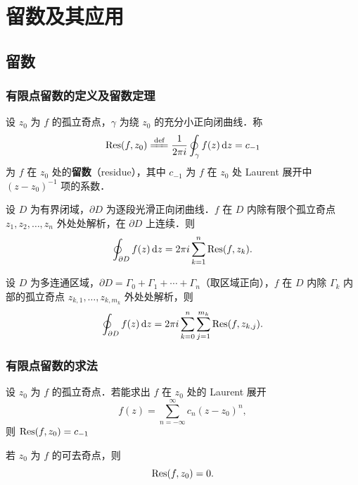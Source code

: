 \documentclass[12pt, a4paper, oneside, UTF8]{ctexbook}
\begin{document}
%
\else
\fi
\chapter{留数及其应用}

\section{留数}

\subsection{有限点留数的定义及留数定理}

\begin{definition}[有限点留数]
设 $z_0$ 为 $f$ 的孤立奇点，$\gamma$ 为绕 $z_0$ 的充分小正向闭曲线．称
\[
\Res(f,z_0) \defeq \frac{1}{2\pi i}\oint_\gamma f(z)\,\d z = c_{-1}
\]
为 $f$ 在 $z_0$ 处的\textbf{留数}（residue），其中 $c_{-1}$ 为 $f$ 在 $z_0$ 处 Laurent 展开中 $(z-z_0)^{-1}$ 项的系数．
\end{definition}

\begin{theorem}[留数定理]
设 $D$ 为有界闭域，$\partial D$ 为逐段光滑正向闭曲线．$f$ 在 $D$ 内除有限个孤立奇点 $z_1,z_2,\dots,z_n$ 外处处解析，在 $\partial D$ 上连续．则
\[
\oint_{\partial D} f(z)\,\d z = 2\pi i\sum_{k=1}^{n}\Res(f,z_k).
\]
\end{theorem}

\begin{theorem}[复合闭路留数定理]
设 $D$ 为多连通区域，$\partial D = \Gamma_0 + \Gamma_1 + \cdots + \Gamma_n$（取区域正向），$f$ 在 $D$ 内除 $\Gamma_k$ 内部的孤立奇点 $z_{k,1},\dots,z_{k,m_k}$ 外处处解析，则
\[
\oint_{\partial D} f(z)\,\d z = 2\pi i\sum_{k=0}^{n}\sum_{j=1}^{m_k}\Res(f,z_{k,j}).
\]
\end{theorem}

\subsection{有限点留数的求法}

\begin{theorem}[利用 Laurent 展开]
设 $z_0$ 为 $f$ 的孤立奇点．若能求出 $f$ 在 $z_0$ 处的 Laurent 展开
\[
f(z) = \sum_{n=-\infty}^{\infty} c_n (z-z_0)^n,
\]
则 $\Res(f,z_0) = c_{-1}$
\end{theorem}

\begin{corollary}[可去奇点的留数]
若 $z_0$ 为 $f$ 的可去奇点，则
\[
\Res(f,z_0) = 0.
\]
\end{corollary}
\end{document}
